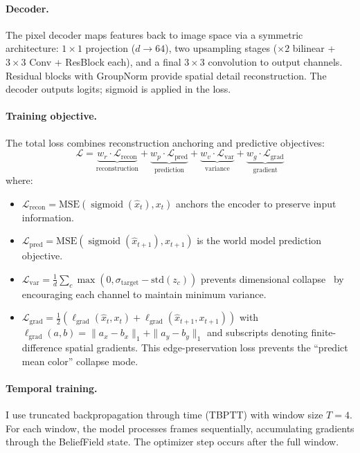\documentclass{article}
\DeclareMathOperator{\sigmoid}{sigmoid}
\begin{document}
\paragraph{Decoder.} The pixel decoder maps features back to image space via a symmetric architecture: $1\!\times\!1$ projection ($d \to 64$), two upsampling stages ($\times 2$ bilinear + $3\!\times\!3$ Conv + ResBlock each), and a final $3\!\times\!3$ convolution to output channels. Residual blocks with GroupNorm provide spatial detail reconstruction. The decoder outputs logits; sigmoid is applied in the loss.

\paragraph{Training objective.} The total loss combines reconstruction anchoring and predictive objectives:
\begin{equation}
    \mathcal{L} = \underbrace{w_r \cdot \mathcal{L}_{\text{recon}}}_{\text{reconstruction}} + \underbrace{w_p \cdot \mathcal{L}_{\text{pred}}}_{\text{prediction}} + \underbrace{w_v \cdot \mathcal{L}_{\text{var}}}_{\text{variance}} + \underbrace{w_g \cdot \mathcal{L}_{\text{grad}}}_{\text{gradient}}
    \label{eq:loss}
\end{equation}
where:
\begin{itemize}
    \item $\mathcal{L}_{\text{recon}} = \text{MSE}(\sigmoid(\hat{x}_t), x_t)$ anchors the encoder to preserve input information.
    \item $\mathcal{L}_{\text{pred}} = \text{MSE}(\sigmoid(\hat{x}_{t+1}), x_{t+1})$ is the world model prediction objective.
    \item $\mathcal{L}_{\text{var}} = \frac{1}{d}\sum_c \max(0, \sigma_{\text{target}} - \text{std}(z_c))$ prevents dimensional collapse~\cite{bardes2022vicreg} by encouraging each channel to maintain minimum variance.
    \item $\mathcal{L}_{\text{grad}} = \frac{1}{2}(\ell_{\text{grad}}(\hat{x}_t, x_t) + \ell_{\text{grad}}(\hat{x}_{t+1}, x_{t+1}))$ with $\ell_{\text{grad}}(a, b) = \|a_x - b_x\|_1 + \|a_y - b_y\|_1$ and subscripts denoting finite-difference spatial gradients. This edge-preservation loss prevents the ``predict mean color'' collapse mode.
\end{itemize}

\paragraph{Temporal training.} I use truncated backpropagation through time (TBPTT) with window size $T=4$. For each window, the model processes frames sequentially, accumulating gradients through the BeliefField state. The optimizer step occurs after the full window.
\end{document}
